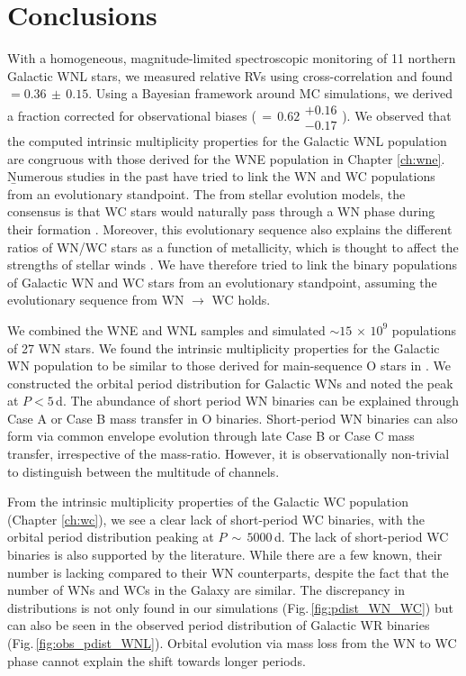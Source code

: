 \section{Conclusions} \label{sect:conclusions_WNL}
With a homogeneous, magnitude-limited spectroscopic monitoring of 11 northern Galactic WNL stars, we measured relative RVs using cross-correlation and found \fobsWNL{}\,$=0.36\,\pm\,0.15$. Using a Bayesian framework around MC simulations, we derived a fraction corrected for observational biases (\fintWNL{}$\,=\,0.62\substack{+0.16 \\ -0.17}$). We observed that the computed intrinsic multiplicity properties for the Galactic WNL population are congruous with those derived for the WNE population in Chapter \ref{ch:wne}. \b{Numerous studies in the past have tried to link the WN and WC populations from an evolutionary standpoint. The from stellar evolution models, the consensus is that WC stars would naturally pass through a WN phase during their formation \citep[see][for an extensive discussion]{langer_presupernova_2012}. Moreover, this evolutionary sequence also explains the different ratios of WN/WC stars as a function of metallicity, which is thought to affect the strengths of stellar winds \citep{shenar_why_2020}. We have therefore tried to link the binary populations of Galactic WN and WC stars from an evolutionary standpoint, assuming the evolutionary sequence from WN $\xrightarrow{}$ WC holds.}


We combined the WNE and WNL samples and simulated ${\sim}15\,\times\,10^9$ populations of 27 WN stars. We found the intrinsic multiplicity properties for the Galactic WN population to be similar to those derived for main-sequence O stars in \citet{sana_binary_2012}. We constructed the orbital period distribution for Galactic WNs and noted the peak at $P<5\,$d. The abundance of short period WN binaries can be explained through Case A or Case B mass transfer in O binaries. Short-period WN binaries can also form via common envelope evolution through late Case B or Case C mass transfer, irrespective of the mass-ratio. However, it is observationally non-trivial to distinguish between the multitude of channels.

From the intrinsic multiplicity properties of the Galactic WC population (Chapter \ref{ch:wc}), we see a clear lack of short-period WC binaries, with the orbital period distribution peaking at $P\,{\sim}\,5000\,$d. The lack of short-period WC binaries is also supported by the literature. While there are a few known, their number is lacking compared to their WN counterparts, despite the fact that the number of WNs and WCs in the Galaxy are similar. The discrepancy in distributions is not only found in our simulations (Fig.\,\ref{fig:pdist_WN_WC}) but can also be seen in the observed period distribution of Galactic WR binaries (Fig.\,\ref{fig:obs_pdist_WNL}). Orbital evolution via mass loss from the WN to WC phase cannot explain the shift towards longer periods.

